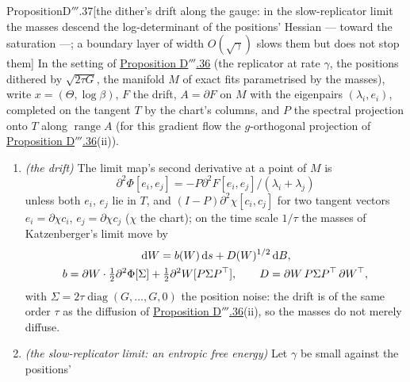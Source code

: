 \begin{thm}{Proposition}{D$'''$.37}[the dither's drift along the gauge: in the slow-replicator limit the masses descend
the log-determinant of the positions' Hessian --- toward the saturation ---; a boundary layer of width $O(\sqrt\gamma)$
slows them but does not stop them]\label{res:thmDppp:37}%
In the setting of \hyperref[res:thmDppp:36]{Proposition D$'''$.36} (the replicator at rate $\gamma$, the positions
dithered by $\sqrt{2\tau G}$, the manifold $M$ of exact fits parametrised by the masses), write
$x = (\Theta,\log\beta)$, $F$ the drift, $A = \partial F$ on $M$ with the eigenpairs $(\lambda_i,e_i)$, completed on the
tangent $T$ by the chart's columns, and $P$ the spectral projection onto $T$ along $\operatorname{range}A$ (for this
gradient flow the $g$-orthogonal projection of \hyperref[res:thmDppp:36]{Proposition D$'''$.36}(ii)).
\begin{enumerate}[label=\textup{(\roman*)}]
  \item \emph{(the drift)} The limit map's second derivative at a point of $M$ is
    \[
      \partial^2\Phi[e_i,e_j] = -P\partial^2F[e_i,e_j]/(\lambda_i + \lambda_j)
    \]
    unless both $e_i$, $e_j$ lie in $T$, and $(I - P)\partial^2\chi[c_i,c_j]$ for two tangent vectors $e_i = \partial\chi c_i$,
    $e_j = \partial\chi c_j$ ($\chi$ the chart); on the time scale $1/\tau$ the masses of Katzenberger's limit move by
    \begin{gather*}
      \,\mathrm{d} W = b(W)\,\mathrm{d} s + D(W)^{1/2}\,\mathrm{d} B,\\
      b = \partial W\cdot\tfrac12\partial^2\Phi[\Sigma] + \tfrac12\partial^2W[P\Sigma P^\top],\qquad
      D = \partial W\,P\Sigma P^\top\,\partial W^\top,
    \end{gather*}
    with $\Sigma = 2\tau\operatorname{diag}(G,\dots,G,0)$ the position noise: the drift is of the same order $\tau$ as
    the diffusion of \hyperref[res:thmDppp:36]{Proposition D$'''$.36}(ii), so the masses do not merely diffuse.
  \item \emph{(the slow-replicator limit: an entropic free energy)} Let $\gamma$ be small against the positions'

\end{enumerate}
\end{thm}

